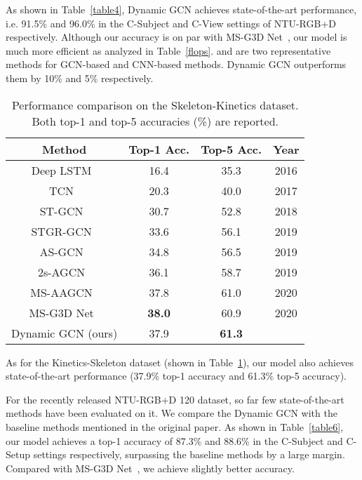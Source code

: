 \documentclass[sigconf]{acmart}
\begin{document}
As shown in Table~\ref{table4}, Dynamic GCN achieves state-of-the-art performance, i.e. 91.5\% and 96.0\% in the C-Subject and C-View settings of NTU-RGB+D respectively. Although our accuracy is on par with MS-G3D Net~\cite{liu2020}, our model is much more efficient as analyzed in Table~\ref{flops}. \cite{yanspatial} and \cite{lili} are two representative methods for GCN-based and CNN-based methods. Dynamic GCN outperforms them by 10\% and 5\% respectively.
\begin{table}[t]
  \caption{Performance comparison on the Skeleton-Kinetics dataset. Both top-1 and top-5 accuracies (\%) are reported.}
  \label{table5}
\begin{tabular}{c|c|c|c}
    \toprule
    Method & Top-1 Acc. & Top-5 Acc. & Year\\
    \midrule
    Deep LSTM~\cite{shahroudy} & 16.4  & 35.3 & 2016\\
    TCN~\cite{kim2017interpretable}   & 20.3  & 40.0 &2017\\
    ST-GCN~\cite{yanspatial} & 30.7  & 52.8&2018 \\
    STGR-GCN~\cite{li2019spatio} & 33.6  & 56.1& 2019 \\
    AS-GCN~\cite{li2019actional} & 34.8  & 56.5 & 2019 \\
    2s-AGCN~\cite{shi2019two} & 36.1  & 58.7 &2019\\
    MS-AAGCN~\cite{shi2019} & 37.8  & 61.0 &2020 \\
    MS-G3D Net~\cite{liu2020} & \textbf{38.0}  & 60.9 &2020 \\
    \midrule
    Dynamic GCN (ours) & 37.9 & \textbf{61.3} \\
    \bottomrule
    \end{tabular}\end{table}

As for the Kinetics-Skeleton dataset (shown in Table~\ref{table5}), our model also achieves state-of-the-art performance (37.9\% top-1 accuracy and 61.3\% top-5 accuracy).

For the recently released NTU-RGB+D 120 dataset, so far few state-of-the-art methods have been evaluated on it. We compare the Dynamic GCN with the baseline methods mentioned in the original paper. As shown in Table~\ref{table6}, our model achieves a top-1 accuracy of 87.3\% and 88.6\% in the C-Subject and C-Setup settings respectively, surpassing the baseline methods by a large margin. Compared with MS-G3D Net~\cite{liu2020}, we achieve slightly better accuracy.
\end{document}
